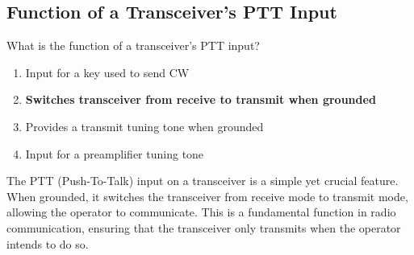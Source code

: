 \subsection{Function of a Transceiver’s PTT Input}
\label{T7A07}

\begin{tcolorbox}[colback=gray!10!white,colframe=black!75!black,title=T7A07]
What is the function of a transceiver’s PTT input?
\begin{enumerate}[noitemsep]
    \item Input for a key used to send CW
    \item \textbf{Switches transceiver from receive to transmit when grounded}
    \item Provides a transmit tuning tone when grounded
    \item Input for a preamplifier tuning tone
\end{enumerate}
\end{tcolorbox}

The PTT (Push-To-Talk) input on a transceiver is a simple yet crucial feature. When grounded, it switches the transceiver from receive mode to transmit mode, allowing the operator to communicate. This is a fundamental function in radio communication, ensuring that the transceiver only transmits when the operator intends to do so.